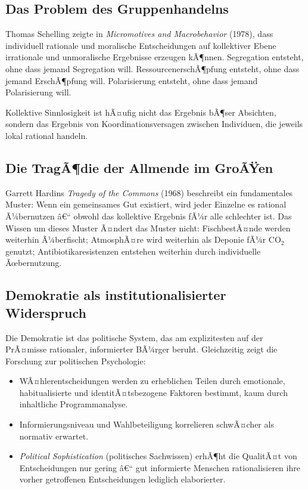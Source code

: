 ﻿\documentclass[12pt, a4paper]{article}
\begin{document}
\subsection{Das Problem des Gruppenhandelns}

Thomas Schelling zeigte in \textit{Micromotives and Macrobehavior} (1978),
dass individuell rationale und moralische Entscheidungen auf kollektiver
Ebene irrationale und unmoralische Ergebnisse erzeugen kÃ¶nnen. Segregation
entsteht, ohne dass jemand Segregation will. RessourcenerschÃ¶pfung entsteht,
ohne dass jemand ErschÃ¶pfung will. Polarisierung entsteht, ohne dass jemand
Polarisierung will.

Kollektive Sinnlosigkeit ist hÃ¤ufig nicht das Ergebnis bÃ¶ser Absichten,
sondern das Ergebnis von Koordinationsversagen zwischen Individuen, die
jeweils lokal rational handeln.

\subsection{Die TragÃ¶die der Allmende im GroÃŸen}

Garrett Hardins \emph{Tragedy of the Commons} (1968) beschreibt ein
fundamentales Muster: Wenn ein gemeinsames Gut existiert, wird jeder
Einzelne es rational Ã¼bernutzen â€“ obwohl das kollektive Ergebnis fÃ¼r alle
schlechter ist. Das Wissen um dieses Muster Ã¤ndert das Muster nicht:
FischbestÃ¤nde werden weiterhin Ã¼berfischt; AtmosphÃ¤re wird weiterhin als
Deponie fÃ¼r CO$_2$ genutzt; Antibiotikaresistenzen entstehen weiterhin durch
individuelle Ãœbernutzung.

\subsection{Demokratie als institutionalisierter Widerspruch}

Die Demokratie ist das politische System, das am explizitesten auf der
PrÃ¤misse rationaler, informierter BÃ¼rger beruht. Gleichzeitig zeigt die
Forschung zur politischen Psychologie:

\begin{itemize}
  \item WÃ¤hlerentscheidungen werden zu erheblichen Teilen durch emotionale,
    habitualisierte und identitÃ¤tsbezogene Faktoren bestimmt, kaum durch
    inhaltliche Programmanalyse.
  \item Informierungsniveau und Wahlbeteiligung korrelieren schwÃ¤cher als
    normativ erwartet.
  \item \emph{Political Sophistication} (politisches Sachwissen) erhÃ¶ht die
    QualitÃ¤t von Entscheidungen nur gering â€“ gut informierte Menschen
    rationalisieren ihre vorher getroffenen Entscheidungen lediglich
    elaborierter.
\end{itemize}
\end{document}
